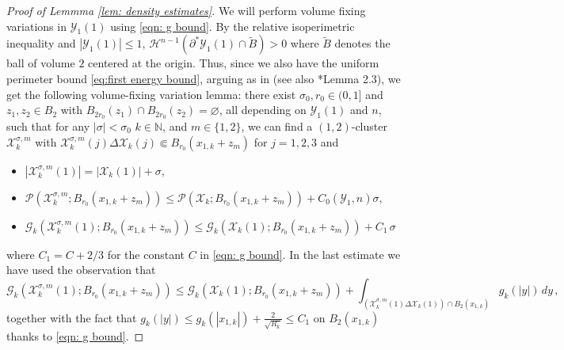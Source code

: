 \documentclass[10pt,reqno]{amsart}
\numberwithin{equation}{section}
\theoremstyle{definition}
\newcommand{\Pcal}{\mathcal{P}}
\newcommand{\cG}{\mathcal{G}}
\newcommand{\X}{\mathcal{X}}
\begin{document}
{\begin{proof}[Proof of Lemmma \ref{lem: density estimates}]
\medskip

We will perform volume fixing variations in $\mathcal{Y}_1(1)$ using \eqref{eqn: g bound}.
By the relative isoperimetric inequality and $|\mathcal{Y}_1(1)|\leq 1$, $\mathcal{H}^{n-1}(\partial^* \mathcal{Y}_1(1) \cap \tilde{B}) >0$ where $\tilde{B}$ denotes the ball of volume $2$ centered at the origin.
Thus, since we also have the uniform perimeter bound \eqref{eq:first energy bound}, arguing as in \cite[Lemma 17.21]{Mag12} (see also \cite{NovTopIhs23}*{Lemma 2.3}), we get the following volume-fixing variation lemma: there exist $\sigma_0,r_0  \in (0,1]$ and $z_1,z_2\in B_2$ with $B_{2r_0}(z_1) \cap B_{2r_0}(z_2)=\varnothing$, all depending on $\mathcal{Y}_1(1)$ and $n$, such that for any $|\sigma|<\sigma_0$ $k\in \mathbb{N}$, and $m\in\{1,2\}$, we can find a $(1,2)$-cluster $\X_k^{\sigma,m}$ with $\X_k^{\sigma,m}(j)\Delta \X_k(j) \Subset B_{r_0}(x_{1,k}+z_m)$ for $j=1,2,3$ and
\begin{itemize}
   \item[(i)] $|\X_k^{\sigma,m}(1)| = |\X_k(1)| + \sigma,$
    \item[(ii)] $\Pcal(\X_k^{\sigma,m};B_{r_0}(x_{1,k}+z_m)) \leq \Pcal(\X_k;B_{r_0}(x_{1,k}+z_m)) + C_0(\mathcal{Y}_1,n) \sigma,$
    \item[(iii)]$\cG_k(\X_k^{\sigma,m}(1);B_{r_0}(x_{1,k}+z_m)) 
    \leq \cG_k(\X_k(1);B_{r_0}(x_{1,k}+z_m)) +C_1 \, \sigma\, $
\end{itemize}
where $C_1=C+2/3$ for the constant $C$ in \eqref{eqn: g bound}. In the last estimate we have used  the observation that 
\[
\cG_k(\X_k^{\sigma,m}(1);B_{r_0}(x_{1,k}+z_m)) \leq \cG_k(\X_k(1);B_{r_0}(x_{1,k}+z_m))+
    \int_{(\X_k^{\sigma,m}(1)\Delta \X_k(1))\cap B_2(x_{1,k})} g_k(|y|)\,dy\,,
\]
together with the fact that  $g_k(|y|) \leq   g_k(|x_{1,k}|) + \tfrac{2}{\sqrt{R_k}} \leq C_1$ on $B_2(x_{1,k})$ thanks to \eqref{eqn: g bound}.

\medskip


\end{proof}}
\end{document}
